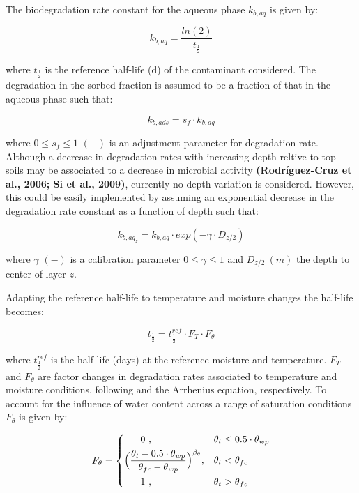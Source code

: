 \documentclass[]{article}
\begin{document}
The biodegradation rate constant for the aqueous phase \(k_{b,aq}\) is
given by:

\begin{equation}
k_{b,aq} = \frac{ln(2)}{t_\frac{1}{2}} 
\label{eq:k_b}
\end{equation}

where \(t_\frac{1}{2}\) is the reference half-life (d) of the
contaminant considered. The degradation in the sorbed fraction is
assumed to be a fraction of that in the aqueous phase such that:

\begin{equation}
k_{b,ads} = s_f \cdot k_{b,aq}   
\label{eq:k_bads}
\end{equation}

where \(0 \leq s_f \leq 1\) \((-)\) is an adjustment parameter for
degradation rate. Although a decrease in degradation rates with
increasing depth reltive to top soils may be associated to a decrease in
microbial activity \textbf{(Rodríguez-Cruz et al., 2006; Si et al.,
2009)}, currently no depth variation is considered. However, this could
be easily implemented by assuming an exponential decrease in the
degradation rate constant as a function of depth such that:

\begin{equation}
k_{{b,aq}_z} = k_{b,aq}\cdot exp(-\gamma \cdot D_{z/2}) 
\label{eq:gamma}
\end{equation}

where \(\gamma\) \((-)\) is a calibration parameter
\(0 \leq \gamma \leq 1\) and \(D_{z/2}~(m)\) the depth to center of
layer \(z\).

Adapting the reference half-life to temperature and moisture changes the
half-life becomes:

\begin{equation}
t_\frac{1}{2}=t_\frac{1}{2}^{ref}\cdot F_T \cdot F_\theta
\label{eq:DT50} 
\end{equation}

where \(t_\frac{1}{2}^{ref}\) is the half-life (days) at the reference
moisture and temperature. \(F_T\) and \(F_\theta\) are factor changes in
degradation rates associated to temperature and moisture conditions,
following \cite{Schroll2006} and the Arrhenius equation, respectively.
To account for the influence of water content across a range of
saturation conditions \(F_\theta\) is given by:

\begin{equation} 
    F_\theta = 
\begin{dcases}
     ~~~~~0~,                 & \theta_t \leq 0.5 \cdot \theta_{wp} \\
    \Big(\frac{ \theta_t- 0.5 \cdot \theta_{wp} } { \theta_{fc} - \theta_{wp} }\Big)^{\beta_{\theta} },    & \theta_t <  \theta_{fc} \\
     ~~~~~1~,                 & \theta_t > \theta_{fc} 
\end{dcases}
\end{equation}
\end{document}
